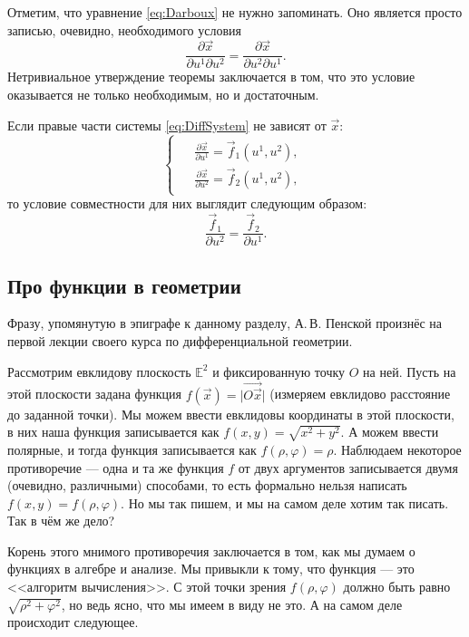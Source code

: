 Отметим, что уравнение \eqref{eq:Darboux} не нужно запоминать. Оно является просто записью, очевидно, необходимого условия
\[
	\frac{\partial\vec{x}}{\partial u^1 \partial u^2} = \frac{\partial\vec{x}}{\partial u^2 \partial u^1}.
\]
Нетривиальное утверждение теоремы заключается в том, что это условие оказывается не только необходимым, но и достаточным.

\begin{example} \label{example:SimpleDiffJointness}
	Если правые части системы \eqref{eq:DiffSystem} не зависят от $\vec{x}$:
	\[
		\begin{cases}
			\begin{aligned}
				&\frac{\partial\vec{x}}{\partial u^1} = \vec{f}_1(u^1, u^2),\\
				&\frac{\partial\vec{x}}{\partial u^2} = \vec{f}_2(u^1, u^2),
			\end{aligned}
		\end{cases}
	\]
	то условие совместности для них выглядит следующим образом:
	\[
		\frac{\vec{f}_1}{\partial u^2} = \frac{\vec{f}_2}{\partial u^1}.
	\]
\end{example}

\subsection{Про функции в геометрии}

Фразу, упомянутую в эпиграфе к данному разделу, А.\,В. Пенской произнёс на первой лекции своего курса по дифференциальной геометрии.

Рассмотрим евклидову плоскость\footnotemark{} $\mathbb{E}^2$ и фиксированную точку $O$ на ней. Пусть на этой плоскости задана функция $f(\vec{x}) = \big|\overrightarrow{O\vec{x}}\big|$ (измеряем евклидово расстояние до заданной точки). Мы можем ввести евклидовы координаты в этой плоскости, в них наша функция записывается как $f(x, y) = \sqrt{x^2 + y^2}$. А можем ввести полярные, и тогда функция записывается как $f(\rho, \varphi) = \rho$. Наблюдаем некоторое противоречие --- одна и та же функция $f$ от двух аргументов записывается двумя (очевидно, различными) способами, то есть формально нельзя написать $f(x, y) = f(\rho, \varphi)$. Но мы так пишем, и мы на самом деле хотим так писать. Так в чём же дело?


Корень этого мнимого противоречия заключается в том, как мы думаем о функциях в алгебре и анализе. Мы привыкли к тому, что функция --- это <<алгоритм вычисления>>. С этой точки зрения $f(\rho, \varphi)$ должно быть равно $\sqrt{\rho^2 + \varphi^2}$, но ведь ясно, что мы имеем в виду не это. А на самом деле происходит следующее.

